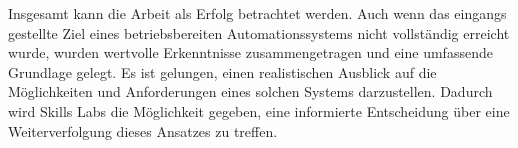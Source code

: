 Insgesamt kann die Arbeit als Erfolg betrachtet werden. Auch wenn das eingangs gestellte Ziel eines betriebsbereiten Automationssystems nicht vollständig erreicht wurde, wurden wertvolle Erkenntnisse zusammengetragen und eine umfassende Grundlage gelegt. Es ist gelungen, einen realistischen Ausblick auf die Möglichkeiten und Anforderungen eines solchen Systems darzustellen. Dadurch wird Skills Labs die Möglichkeit gegeben, eine informierte Entscheidung über eine Weiterverfolgung dieses Ansatzes zu treffen.
